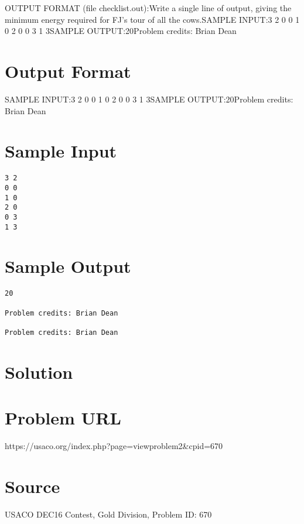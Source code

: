 \documentclass[12pt]{article}
\begin{document}
OUTPUT FORMAT (file checklist.out):Write a single line of output, giving the minimum energy required for FJ's tour
of all the cows.SAMPLE INPUT:3 2
0 0
1 0
2 0
0 3
1 3SAMPLE OUTPUT:20Problem credits: Brian Dean

\section*{Output Format}
SAMPLE INPUT:3 2
0 0
1 0
2 0
0 3
1 3SAMPLE OUTPUT:20Problem credits: Brian Dean

\section*{Sample Input}
\begin{verbatim}
3 2
0 0
1 0
2 0
0 3
1 3
\end{verbatim}

\section*{Sample Output}
\begin{verbatim}
20

Problem credits: Brian Dean

Problem credits: Brian Dean
\end{verbatim}

\section*{Solution}


\section*{Problem URL}
https://usaco.org/index.php?page=viewproblem2&cpid=670

\section*{Source}
USACO DEC16 Contest, Gold Division, Problem ID: 670
\end{document}
